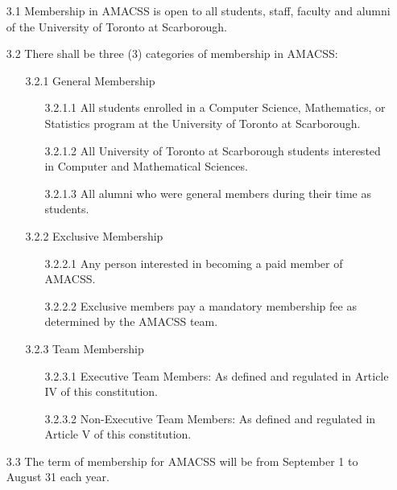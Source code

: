 \documentclass[12pt,a4paper]{article}
\begin{document}
\begin{enumerate}
\item[3.1] Membership in AMACSS is open to all students, staff, faculty and alumni of the University of Toronto at Scarborough.

\item[3.2] There shall be three (3) categories of membership in AMACSS:

\begin{enumerate}
\item[3.2.1] General Membership

\begin{enumerate}
\item[3.2.1.1] All students enrolled in a Computer Science, Mathematics, or Statistics program at the University of Toronto at Scarborough.

\item[3.2.1.2] All University of Toronto at Scarborough students interested in Computer and Mathematical Sciences.

\item[3.2.1.3] All alumni who were general members during their time as students.
\end{enumerate}

\item[3.2.2] Exclusive Membership

\begin{enumerate}
\item[3.2.2.1] Any person interested in becoming a paid member of AMACSS.

\item[3.2.2.2] Exclusive members pay a mandatory membership fee as determined by the AMACSS team.
\end{enumerate}

\item[3.2.3] Team Membership

\begin{enumerate}
\item[3.2.3.1] Executive Team Members: As defined and regulated in Article IV of this constitution.

\item[3.2.3.2] Non-Executive Team Members: As defined and regulated in Article V of this constitution.
\end{enumerate}
\end{enumerate}

\item[3.3] The term of membership for AMACSS will be from September 1 to August 31 each year.


\end{enumerate}
\end{document}
